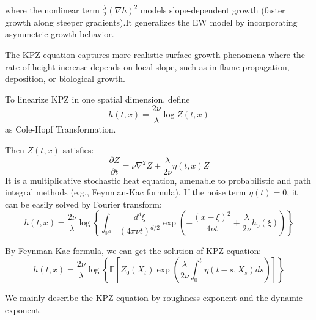 where the nonlinear term $\frac{\lambda}{2} (\nabla h)^2$ models slope-dependent growth (faster growth along steeper gradients).It generalizes the EW model by incorporating asymmetric growth behavior.

The KPZ equation captures more realistic surface growth phenomena where the rate of height increase depends on local slope, such as in flame propagation, deposition, or biological growth.

To linearize KPZ in one spatial dimension, define
\[
h(t,x) = \frac{2\nu}{\lambda} \log Z(t,x)
\] as Cole-Hopf Transformation.

Then $Z(t,x)$ satisfies:
\[
\frac{\partial Z}{\partial t} = \nu \nabla^2 Z + \frac{\lambda}{2\nu} \eta(t,x) Z
\]
It is a multiplicative stochastic heat equation, amenable to probabilistic and path integral methods (e.g., Feynman-Kac formula).
If the noise term $\eta(t)=0$, it can be easily solved by Fourier transform:
\begin{equation}
    h(t, x) = \frac{2\nu}{\lambda} \log \left\{ 
        \int_{\mathbb{R}^d} \frac{d^d \xi}{(4\pi \nu t)^{d/2}} \exp\left(-\frac{(x - \xi)^2}{4\nu t} + \frac{\lambda}{2\nu} h_0(\xi)\right)
    \right\}
\end{equation}

By Feynman-Kac formula, we can get the solution of KPZ equation:
\begin{equation}
    h(t, x) = \frac{2\nu}{\lambda} \log \left\{ \mathbb{E}\left[ Z_0(X_t)\exp\left( \frac{\lambda}{2\nu} \int_0^t \eta(t-s, X_s) ds \right) \right] \right\}
\end{equation}

We mainly describe the KPZ equation by roughness exponent and the dynamic exponent.
